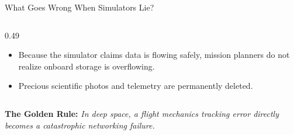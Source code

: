 \documentclass[aspectratio=169,10pt]{beamer}
\begin{document}
\begin{frame}{What Goes Wrong When Simulators Lie?}
\begin{columns}[T]
\begin{column}{0.49\textwidth}
      \vspace{1.5pt}
      \begin{tcolorbox}[colback=cardBg,colframe=spaceNavy,title=\textbf{4. Catastrophic Lost Science Data},top=1.5pt,bottom=1.5pt]
        \small
        \begin{itemize}\setlength{\itemsep}{0.8pt}
          \item Because the simulator claims data is flowing safely, mission planners do not realize onboard storage is overflowing.
          \item Precious scientific photos and telemetry are permanently deleted.
        \end{itemize}
      \end{tcolorbox}
    \end{column}
  \end{columns}

  \vspace{1.5pt}
  \begin{tcolorbox}[colback=cardBg,colframe=spaceNavy,top=1.5pt,bottom=1.5pt]
    \centering\footnotesize\color{spaceNavy}
    \textbf{The Golden Rule:} \textit{In deep space, a flight mechanics tracking error directly becomes a catastrophic networking failure.}
  \end{tcolorbox}
\end{frame}
\end{document}
